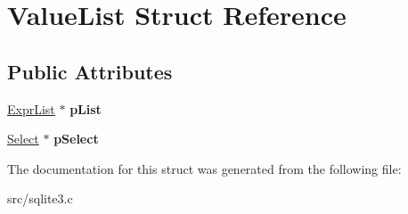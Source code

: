 \hypertarget{struct_value_list}{\section{Value\-List Struct Reference}
\label{struct_value_list}
}
\subsection*{Public Attributes}
\begin{DoxyCompactItemize}
\item 
\hypertarget{struct_value_list_a6119dd8fd520ba00ebbe9425be94184b}{\hyperlink{struct_expr_list}{Expr\-List} $\ast$ {\bfseries p\-List}}\label{struct_value_list_a6119dd8fd520ba00ebbe9425be94184b}

\item 
\hypertarget{struct_value_list_a1cce43c59968143faef1a9e457fad59a}{\hyperlink{struct_select}{Select} $\ast$ {\bfseries p\-Select}}\label{struct_value_list_a1cce43c59968143faef1a9e457fad59a}

\end{DoxyCompactItemize}


The documentation for this struct was generated from the following file\-:\begin{DoxyCompactItemize}
\item 
src/sqlite3.\-c\end{DoxyCompactItemize}
